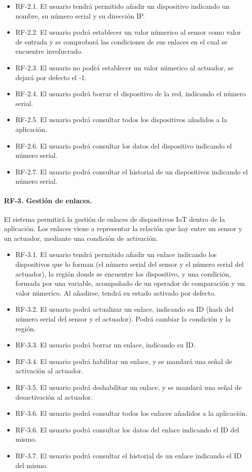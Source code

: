 \begin{itemize}
    \item[] RF-2.1. El usuario tendrá permitido añadir un dispositivo indicando un nombre, su número serial y su dirección
    IP.
    \item[] RF-2.2. El usuario podrá establecer un valor númerico al sensor como valor de entrada y se comprobará las 
    condiciones de sus enlaces en el cual se encuentre involucrado.
    \item[] RF-2.3. El usuario no podrá establecer un valor númerico al actuador, se dejará por defecto el -1.
    \item[] RF-2.4. El usuario podrá borrar el dispositivo de la red, indicando el número serial.
    \item[] RF-2.5. El usuario podrá consultar todos los dispositivos añadidos a la aplicación.
    \item[] RF-2.6. El usuario podrá consultar los datos del dispositivo indicando el número serial.
    \item[] RF-2.7. El usuario podrá consultar el historial de un dispositivos indicando el número serial.
\end{itemize}

\paragraph{RF-3. Gestión de enlaces.} El sistema permitirá la gestión de enlaces de dispositivos IoT dentro de la 
aplicación. Los enlaces  viene a representar la relación que hay entre un sensor y un actuador, mediante una condición de 
activación.

\begin{itemize}
    \item[] RF-3.1. El usuario tendrá permitido añadir un enlace indicando los dispositivos que lo forman (el número 
    serial del sensor y el número serial del actuador), la región donde se encuentre los dispositivo, y una condición, 
    formada por una variable, acompañado de un operador de comparación y un valor númerico. Al añadirse, tendrá su estado 
    activado por defecto.
    \item[] RF-3.2. El usuario podrá actualizar un enlace, indicando su ID (hash del número serial del sensor y el 
    actuador). Podrá cambiar la condición y la región.
    \item[] RF-3.3. El usuario podrá borrar un enlace, indicando su ID.
    \item[] RF-3.4. El usuario podrá habilitar un enlace, y se mandará una señal de activación al actuador. 
    \item[] RF-3.5. El usuario podrá deshabilitar un enlace, y se mandará una señal de desactivación al actuador.
    \item[] RF-3.6. El usuario podrá consultar todos los enlaces añadidos a la aplicación.
    \item[] RF-3.6. El usuario podrá consultar los datos del enlace indicando el ID del mismo.
    \item[] RF-3.7. El usuario podrá consultar el historial de un enlace indicando el ID del mismo.
\end{itemize}

